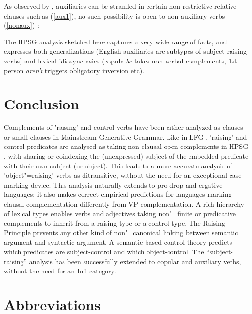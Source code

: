 \documentclass[output=paper
	        ,collection
	        ,collectionchapter
 	        ,biblatex
                ,babelshorthands
                ,newtxmath
                ,draftmode
                ,colorlinks, citecolor=brown
]{langscibook}
\begin{document}
As observed by \citet{ArnoldandBorsley2008}, auxiliaries can be stranded in certain non-restrictive relative clauses such as (\ref{aux1}), no such possibility is open to non-auxiliary verbs (\ref{nonaux}) :

\eal
{}
\zl

The HPSG analysis sketched here captures a very wide range of facts, and expresses both generalizations (English auxiliaries are subtypes of subject-raising verbs) and lexical idiosyncrasies (copula \emph{be} takes non verbal complements, 1st person \emph{aren't} triggers obligatory inversion etc).


	
\section{Conclusion}
Complements of 'raising' and control verbs have been either analyzed as clauses \citep{Chomsky81a} or small clauses \citep{Stowell81a-u,Stowell1983} in Mainstream Generative Grammar.
Like in LFG \citep{Bresnan1982}, 'raising' and control predicates are analysed as taking non-clausal open complements in HPSG \citep{PollardandSag1994}, with sharing or coindexing the (unexpressed) subject of the embedded predicate with their own subject (or object). This leads to a more accurate analysis of 'object"=raising' verbs as ditransitive, without the need for an exceptional case marking device. This analysis naturally extends to pro-drop and ergative languages; it also makes correct empirical predictions for languages marking clausal complementation differently from VP complementation. A rich hierarchy of lexical types enables verbs and adjectives taking non"=finite or predicative complements to inherit from a raising-type or a control-type. The Raising Principle prevents any other kind of non"=canonical linking between semantic argument and syntactic argument. A semantic-based control theory predicts which predicates are subject-control and which object-control. The ``subject-raising'' analysis has been successfully extended to copular and auxiliary verbs, without the need for an Infl category.




\section*{Abbreviations}
\end{document}
